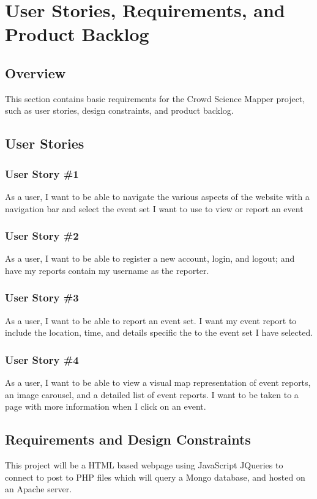 
\chapter{User Stories,  Requirements, and Product Backlog}
\section{Overview}

This section contains basic requirements for the Crowd Science Mapper project, such as user stories, design constraints, and product backlog. 

\section{User Stories}

\subsection{User Story \#1} 
As a user, I want to be able to navigate the various aspects of the website with a navigation bar and select the event set I want to use to view or report an event

\subsection{User Story \#2}
 As a user, I want to be able to register a new account, login, and logout; and have my reports contain my username as the reporter.

\subsection{User Story \#3} 
As a user, I want to be able to report an event set. I want my event report to include the location, time, and details specific the to the event set I have selected.

\subsection{User Story \#4} 
As a user, I want to be able to view a visual map representation of event reports, an image carousel, and a detailed list of event reports. I want to be taken to a page with more information when I click on an event.

\section{Requirements and Design Constraints}
This project will be a HTML based webpage using JavaScript JQueries to connect to post to PHP files which will query a Mongo database, and hosted on an Apache server.

